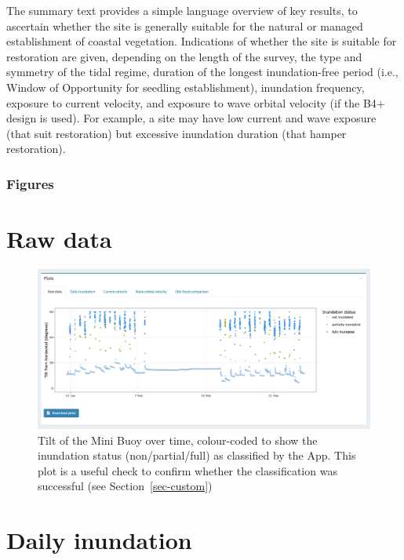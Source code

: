 \documentclass[
  letterpaper,
  DIV=11,
  numbers=noendperiod]{scrreprt}
\begin{document}
The summary text provides a simple language overview of key results, to
ascertain whether the site is generally suitable for the natural or
managed establishment of coastal vegetation. Indications of whether the
site is suitable for restoration are given, depending on the length of
the survey, the type and symmetry of the tidal regime, duration of the
longest inundation-free period (i.e., Window of Opportunity for seedling
establishment), inundation frequency, exposure to current velocity, and
exposure to wave orbital velocity (if the B4+ design is used). For
example, a site may have low current and wave exposure (that suit
restoration) but excessive inundation duration (that hamper
restoration).

\hypertarget{figures}{%
\subsubsection{Figures}\label{figures}}

\section{Raw data}

\begin{figure}

{\centering \includegraphics[width=1\textwidth,height=\textheight]{chapters/figs/RawData.png}

}

\caption{Tilt of the Mini Buoy over time, colour-coded to show the
inundation status (non/partial/full) as classified by the App. This plot
is a useful check to confirm whether the classification was successful
(see Section~\ref{sec-custom})}

\end{figure}

\section{Daily inundation}
\end{document}
